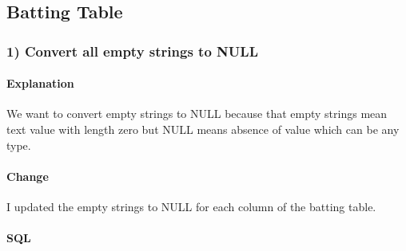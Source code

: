 \documentclass[11pt]{article}
\begin{document}
    

    \hypertarget{batting-table}{%
\subsection{Batting Table}\label{batting-table}}

\hypertarget{convert-all-empty-strings-to-null}{%
\subsubsection{1) Convert all empty strings to
NULL}\label{convert-all-empty-strings-to-null}}

\hypertarget{explanation}{%
\paragraph{Explanation}\label{explanation}}

    We want to convert empty strings to NULL because that empty strings mean
text value with length zero but NULL means absence of value which can be
any type.

    \hypertarget{change}{%
\paragraph{Change}\label{change}}

    I updated the empty strings to NULL for each column of the batting
table.

    \hypertarget{sql}{%
\paragraph{SQL}\label{sql}}
\end{document}
